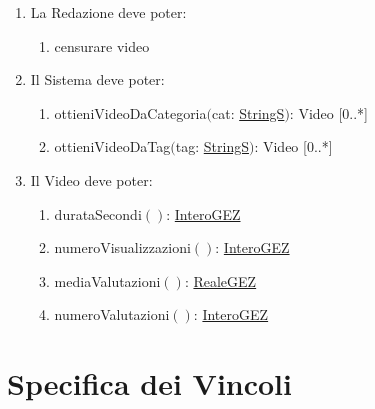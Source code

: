 \documentclass{article}
\begin{document}
\begin{enumerate}
\begin{enumerate}
    \end{enumerate}
    \item\label{sec:OperazioniRedazione} La Redazione deve poter:
    \begin{enumerate}
        \item censurare video
    \end{enumerate}
    \item\label{sec:OperazioniSistema} Il Sistema deve poter:
    \begin{enumerate}
        \item ottieniVideoDaCategoria$($cat: \hyperref[sec:TipoStringS]{StringS}$)$: Video [0..*]
        \item ottieniVideoDaTag$($tag: \hyperref[sec:TipoStringS]{StringS}$)$: Video [0..*]
    \end{enumerate}
    \item\label{sec:OperazioniVideo} Il Video deve poter:
    \begin{enumerate}
        \item durataSecondi$()$: \hyperref[sec:TipoInteroGEZ]{InteroGEZ}
        \item numeroVisualizzazioni$()$: \hyperref[sec:TipoInteroGEZ]{InteroGEZ}
        \item mediaValutazioni$()$: \hyperref[sec:TipoRealeGEZ]{RealeGEZ}
        \item numeroValutazioni$()$: \hyperref[sec:TipoInteroGEZ]{InteroGEZ}
    \end{enumerate}
\end{enumerate}

\newpage

\section{\label{sec:Vincoli}Specifica dei Vincoli}
\end{document}
